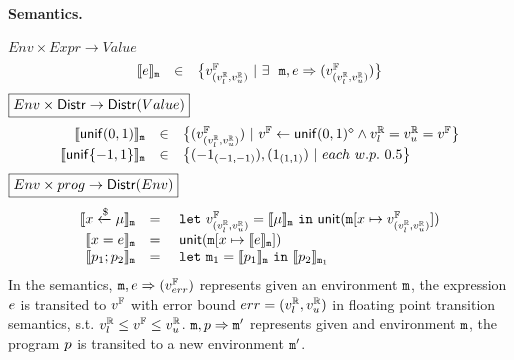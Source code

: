 \documentclass[a4paper,11pt]{article}
\begin{document}
\paragraph{Semantics.}
$\boxed{Env \times Expr \to Value }$
%
\[
	\begin{array}{rcl}
	\llbracket e \rrbracket_{\mathtt{m}}
	& \in &  
	\big\{v^{\mathbb{F}}_{(v^{\mathbb{R}}_{l}, v^{\mathbb{R}}_{u})} ~|~
	\exists ~~  
	\mathtt{m},  
	e \Rightarrow (v^{\mathbb{F}}_{(v^{\mathbb{R}}_{l}, v^{\mathbb{R}}_{u})})\big\}
	\end{array}
\]
%
$
\boxed{Env \times \mathsf{Distr} \to 
\mathsf{Distr}(Value)}
$
%
\[
	\begin{array}{rcl}
	\llbracket \mathsf{unif}(0, 1) \rrbracket_{\mathtt{m}}
	& \in & 
	\big\{
	(v^{\mathbb{F}}_{(v^{\mathbb{R}}_{l}, v^{\mathbb{R}}_{u})}) ~|~
	v^{\mathbb{F}} \leftarrow \mathsf{unif}(0, 1)^{\diamond}
	\land v^{\mathbb{R}}_{l} = v^{\mathbb{R}}_{u} = v^{\mathbb{F}}
	\big\}\\
	\llbracket \mathsf{unif}\{-1, 1\} \rrbracket_{\mathtt{m}}
	& \in & 
	\big\{
	(-1_{(-1, -1)}), (1_{(1, 1)}) ~|~
	each ~ w.p. ~ 0.5 
	\big\}\\	
	\end{array}
\]
%
$\boxed{Env \times prog \to \mathsf{Distr}(Env)}$
\[
\begin{array}{rcl}
	\llbracket x \xleftarrow{\$} \mu \rrbracket_{\mathtt{m}}
	& = & 
	~\mathtt{let}~ v^{\mathbb{F}}_{(v^{\mathbb{R}}_{l}, v^{\mathbb{R}}_{u})} = \llbracket \mu \rrbracket_{\mathtt{m}}
	~\mathtt{in}~ 
	\mathsf{unit}(\mathtt{m}[x \mapsto v^{\mathbb{F}}_{(v^{\mathbb{R}}_{l}, v^{\mathbb{R}}_{u})}])
	\\
	\llbracket x = e \rrbracket_{\mathtt{m}}
	& = &  
	~\mathsf{unit}(\mathtt{m}[x \mapsto \llbracket e \rrbracket_{\mathtt{m}}])
	\\
	\llbracket p_1; p_2 \rrbracket_{\mathtt{m}}
	& = &  ~\mathtt{let}~  \mathtt{m}_1 = 
	\llbracket p_1 \rrbracket_{\mathtt{m}} ~\mathtt{in}~
	\llbracket p_2 \rrbracket_{\mathtt{m}_1} 
\end{array}
\]
%
In the semantics, 
%
$\mathtt{m}, e \Rightarrow (v^{\mathbb{F}}_{err})$ represents given an environment
%
$\mathtt{m}$, the expression $e$
%
is transited to $v^{\mathbb{F}}$ with error bound $err = (v^{\mathbb{R}}_{l}, v^{\mathbb{R}}_{u})$
in floating point transition semantics,
%
s.t. $v^{\mathbb{R}}_{l} \leq v^{\mathbb{F}} \leq v^{\mathbb{R}}_{u}$.
%
$\mathtt{m}, p \Rightarrow \mathtt{m}'$ represents given and environment $\mathtt{m}$,
%
the program $p$ is transited to a new environment $\mathtt{m}'$.
%
%
%
\end{document}
